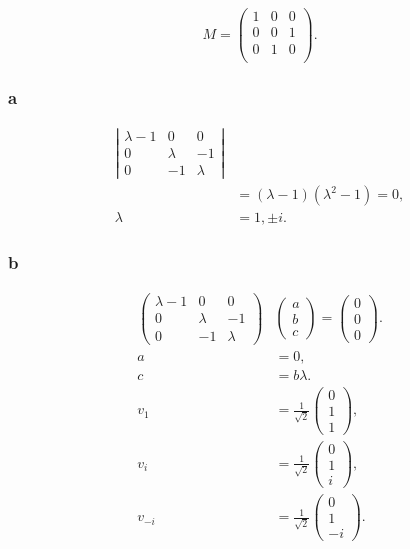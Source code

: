 \documentclass[a4paper,12pt,twoside]{article}
\begin{document}
\subsection{}%
\begin{equation}
	M = \begin{pmatrix}
	 1 & 0 & 0 \\
	 0 & 0 & 1 \\
	 0 & 1 & 0 \\
	\end{pmatrix}.
\end{equation}
\subsubsection*{a}
\begin{align}
	\left| \begin{matrix}
	 \lambda-1 & 0 & 0 \\
	 0 & \lambda & -1 \\
	 0 & -1 & \lambda
	\end{matrix}\right|\!\!\!\!\!\!\!\!\!\!\!\!&\nonumber\\
	&= (\lambda-1)(\lambda^2-1) = 0,\\
	\lambda &= 1,\pm i.
\end{align}
\subsubsection*{b}
\begin{align}
	\begin{pmatrix}
	 \lambda-1 & 0 & 0 \\
	 0 & \lambda & -1 \\
	 0 & -1 & \lambda
	\end{pmatrix}&
	\begin{pmatrix}
		a \\ b \\ c
	\end{pmatrix}
	= \begin{pmatrix}
		0 \\ 0 \\ 0
	\end{pmatrix}.\\
	a &= 0,\\
	c &= b\lambda.\\
	v_1 &= \frac{1}{\sqrt{2}}\begin{pmatrix}
		0 \\ 1 \\ 1
	\end{pmatrix},\\
	v_i &= \frac{1}{\sqrt{2}}\begin{pmatrix}
		0 \\ 1 \\ i
	\end{pmatrix},\\
	v_{-i} &= \frac{1}{\sqrt{2}}\begin{pmatrix}
		0 \\ 1 \\ -i
	\end{pmatrix}.
\end{align}
\end{document}

